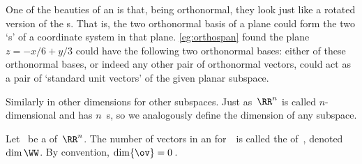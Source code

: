 One of the beauties of an  is that, being orthonormal, they look just like a rotated version of the s.
That is, the two orthonormal basis of a plane could form the two `s' of a coordinate system in that plane.
\cref{eg:orthospan} found the plane \(z=-x/6+y/3\) could have the following two orthonormal bases: either of these orthonormal bases, or indeed any other pair of orthonormal vectors, could act as a pair of `standard unit vectors' of the given planar subspace.
\begin{center}
\quad
{} 
\end{center}
Similarly in other dimensions for other subspaces.
Just as~\(\RR^n\) is called \(n\)-dimensional and has \(n\)~s, so we analogously define the dimension of any subspace.

\begin{definition} \label{def:dim} 
Let \WW\ be a  of~\(\RR^n\). 
The number of vectors in an  for~\WW\ is called the  of~\WW, denoted~\(\dim\WW\).
By convention, \(\dim\{\ov\}=0\)\,.
\end{definition}

